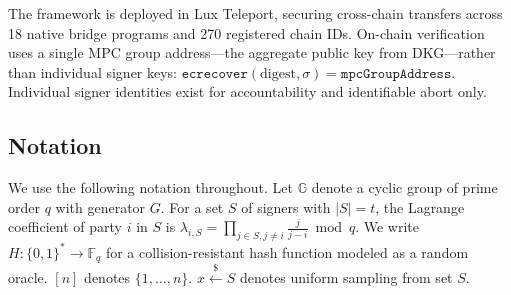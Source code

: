 The framework is deployed in Lux Teleport, securing cross-chain transfers across
18 native bridge programs and 270 registered chain IDs. On-chain verification uses
a single MPC group address---the aggregate public key from DKG---rather than
individual signer keys: $\texttt{ecrecover}(\text{digest}, \sigma) = \texttt{mpcGroupAddress}$.
Individual signer identities exist for accountability and identifiable abort only.

\subsection{Notation}

We use the following notation throughout. Let $\mathbb{G}$ denote a cyclic group of
prime order $q$ with generator $G$. For a set $S$ of signers with $|S| = t$, the
Lagrange coefficient of party $i$ in $S$ is $\lambda_{i,S} = \prod_{j \in S, j \neq i}
\frac{j}{j - i} \bmod q$. We write $H : \{0,1\}^* \to \mathbb{F}_q$ for a
collision-resistant hash function modeled as a random oracle. $[n]$ denotes
$\{1, \ldots, n\}$. $x \xleftarrow{\$} S$ denotes uniform sampling from set $S$.

